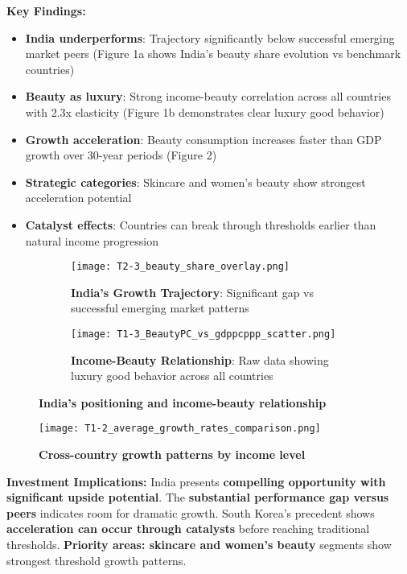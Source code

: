 \documentclass[11pt]{article}
\begin{document}
\textbf{Key Findings:}
\vspace{-5pt}
\begin{itemize}
    \setlength{\itemsep}{-2pt}
    \item \textbf{India underperforms}: Trajectory significantly below successful emerging market peers (Figure 1a shows India's beauty share evolution vs benchmark countries)
    \item \textbf{Beauty as luxury}: Strong income-beauty correlation across all countries with 2.3x elasticity (Figure 1b demonstrates clear luxury good behavior)
    \item \textbf{Growth acceleration}: Beauty consumption increases faster than GDP growth over 30-year periods (Figure 2)
    \item \textbf{Strategic categories}: Skincare and women's beauty show strongest acceleration potential
    \item \textbf{Catalyst effects}: Countries can break through thresholds earlier than natural income progression
\end{itemize}

\vspace{-10pt}
\begin{figure}[H]
\centering
\begin{subfigure}[b]{0.48\textwidth}
    \texttt{[image: T2-3\_beauty\_share\_overlay.png]}
    \caption{\textbf{India's Growth Trajectory}: Significant gap vs successful emerging market patterns}
\end{subfigure}
\hfill
\begin{subfigure}[b]{0.48\textwidth}
    \texttt{[image: T1-3\_BeautyPC\_vs\_gdppcppp\_scatter.png]}
    \caption{\textbf{Income-Beauty Relationship}: Raw data showing luxury good behavior across all countries}
\end{subfigure}
\caption{\textbf{India's positioning and income-beauty relationship}}
\end{figure}
\vspace{-10pt}

\begin{figure}[H]
\centering
\texttt{[image: T1-2\_average\_growth\_rates\_comparison.png]}
\caption{\textbf{Cross-country growth patterns by income level}}
\end{figure}
\vspace{-10pt}

\textbf{Investment Implications:} India presents \textbf{compelling opportunity with significant upside potential}. The \textbf{substantial performance gap versus peers} indicates room for dramatic growth. South Korea's precedent shows \textbf{acceleration can occur through catalysts} before reaching traditional thresholds. \textbf{Priority areas: skincare and women's beauty} segments show strongest threshold growth patterns.
\end{document}
